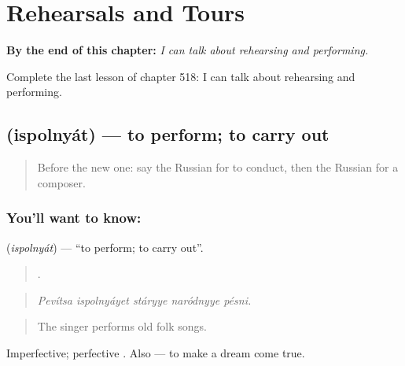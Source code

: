 
\chapter{Rehearsals and Tours}
\label{ch:ru-rehearsals-and-tours}

\begin{chapteropening}
\textbf{By the end of this chapter:} \emph{I can talk about rehearsing and performing.}

Complete the last lesson of chapter 518: I can talk about rehearsing and performing.
\end{chapteropening}

\section[\texorpdfstring{\ru{исполнять} (ispolnyát)}{исполнять (ispolnyát)}]{ (ispolnyát) — to perform; to carry out}

\label{lesson:RU-C518-ispolnyat}



\begin{quote}
Before the new one: say the Russian for to conduct, then the Russian for a composer.
\end{quote}

\subsection*{You'll want to know: }
\textbf{} (\emph{ispolnyát}) — \textquotedblleft{}to perform; to carry out\textquotedblright{}.

\begin{quote}
    .
\end{quote}

\begin{quote}
\emph{Pevítsa ispolnyáyet stáryye naródnyye pésni.}
\end{quote}

\begin{quote}
The singer performs old folk songs.
\end{quote}

Imperfective; perfective . Also \emph{ } — to make a dream come true.

